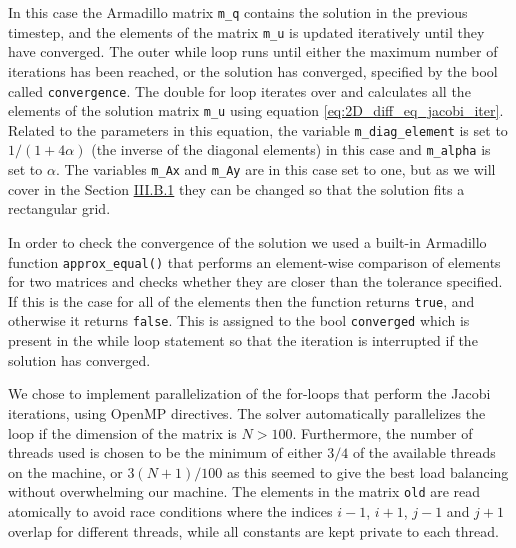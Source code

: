 \documentclass[reprint,english,notitlepage]{revtex4-1}  %
\begin{document}
In this case the Armadillo matrix \verb+m_q+ contains the solution in the previous timestep, and the elements of the matrix \verb+m_u+ is updated iteratively until they have converged. The outer while loop runs until either the maximum number of iterations has been reached, or the solution has converged, specified by the bool called \verb+convergence+. The double for loop iterates over and calculates all the elements of the solution matrix \verb+m_u+ using equation \eqref{eq:2D_diff_eq_jacobi_iter}. Related to the parameters in this equation, the variable \verb+m_diag_element+ is set to $1/(1 + 4\alpha)$ (the inverse of the diagonal elements) in this case and \verb+m_alpha+ is set to $\alpha$. The variables \verb+m_Ax+ and \verb+m_Ay+ are in this case set to one, but as we will cover in the Section \hyperref[sec:method_heat_solver]{III.B.1} they can be changed so that the solution fits a rectangular grid. 

In order to check the convergence of the solution we used a built-in Armadillo function \verb+approx_equal()+ that performs an element-wise comparison of elements for two matrices and checks whether they are closer than the tolerance specified. If this is the case for all of the elements then the function returns \verb+true+, and otherwise it returns \verb+false+. This is assigned to the bool \verb+converged+ which is present in the while loop statement so that the iteration is interrupted if the solution has converged.

We chose to implement parallelization of the for-loops that perform the Jacobi iterations, using OpenMP directives. The solver automatically parallelizes the loop if the dimension of the matrix is \(N > 100\). Furthermore, the number of threads used is chosen to be the minimum of either \(3/4\) of the available threads on the machine, or \(3(N+1)/100\) as this seemed to give the best load balancing without overwhelming our machine. The elements in the matrix \verb+old+ are read atomically to avoid race conditions where the indices \(i-1\), \(i+1\), \(j-1\) and \(j+1\) overlap for different threads, while all constants are kept private to each thread.

\end{document}
